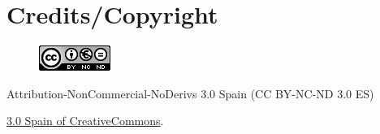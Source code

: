 \chapter*{Credits/Copyright}

\vspace{1cm}

\begin{figure}[ht]
\centering
\includegraphics[scale=1]{images/license.png}
\end{figure}

Attribution-NonCommercial-NoDerivs 3.0 Spain (CC BY-NC-ND 3.0 ES) 

\href{https://creativecommons.org/licenses/by-nc-nd/3.0/es/}{3.0 Spain of CreativeCommons}.